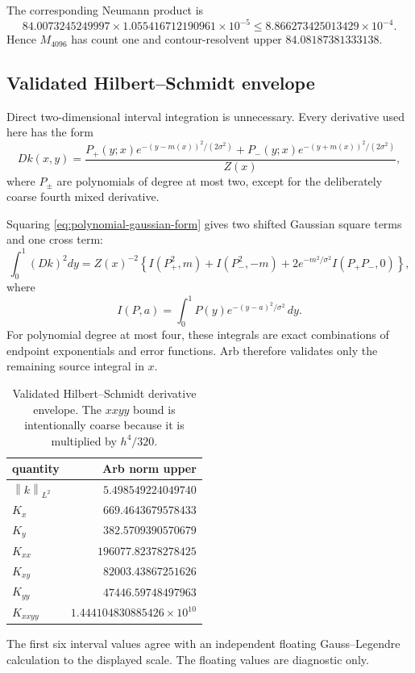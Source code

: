 \documentclass[11pt]{article}
\theoremstyle{definition}
\theoremstyle{remark}
\newcommand{\norm}[1]{\left\lVert #1\right\rVert}
\begin{document}
The corresponding Neumann product is
\[
 84.0073245249997
 \times1.055416712190961\times10^{-5}
 \le8.866273425013429\times10^{-4}.
\]
Hence $M_{4096}$ has count one and contour-resolvent upper
$84.08187381333138$.

\subsection{Validated Hilbert--Schmidt envelope}

Direct two-dimensional interval integration is unnecessary.  Every
derivative used here has the form
\begin{equation}
 Dk(x,y)=\frac{
 P_+(y;x)e^{-(y-m(x))^2/(2\sigma^2)}
 +P_-(y;x)e^{-(y+m(x))^2/(2\sigma^2)}
 }{Z(x)},
 \label{eq:polynomial-gaussian-form}
\end{equation}
where $P_\pm$ are polynomials of degree at most two, except for the
deliberately coarse fourth mixed derivative.

Squaring \eqref{eq:polynomial-gaussian-form} gives two shifted Gaussian
square terms and one cross term:
\[
 \int_0^1(Dk)^2dy
 =Z(x)^{-2}\left\{
 I(P_+^2,m)+I(P_-^2,-m)
 +2e^{-m^2/\sigma^2}I(P_+P_-,0)
 \right\},
\]
where
\[
 I(P,a)=\int_0^1P(y)e^{-(y-a)^2/\sigma^2}\,dy.
\]
For polynomial degree at most four, these integrals are exact combinations
of endpoint exponentials and error functions.  Arb therefore validates only
the remaining source integral in $x$.

\begin{table}[H]
\centering
\caption{Validated Hilbert--Schmidt derivative envelope.  The $xxyy$ bound
is intentionally coarse because it is multiplied by $h^4/320$.}
\label{tab:hilbert-envelope}
\begin{tabular}{@{}lr@{}}
\toprule
quantity & Arb norm upper\\
\midrule
$\norm k_{L^2}$ & $5.498549224049740$\\
$K_x$ & $669.4643679578433$\\
$K_y$ & $382.5709390570679$\\
$K_{xx}$ & $196077.82378278425$\\
$K_{xy}$ & $82003.43867251626$\\
$K_{yy}$ & $47446.59748497963$\\
$K_{xxyy}$ & $1.444104830885426\times10^{10}$\\
\bottomrule
\end{tabular}
\end{table}

The first six interval values agree with an independent floating
Gauss--Legendre calculation to the displayed scale.  The floating values
are diagnostic only.
\end{document}
